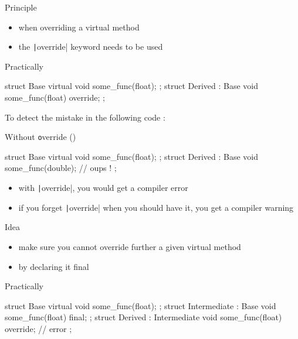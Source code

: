 \begin{frame}[fragile]
  \begin{block}{Principle}
    \begin{itemize}
    \item when overriding a virtual method
    \item the \texttt|override| keyword needs to be used
    \end{itemize}
  \end{block}
  \begin{exampleblock}{Practically}
    \begin{cppcode}
      struct Base {
        virtual void some_func(float);
      };
      struct Derived : Base {
        void some_func(float) override;
      };
    \end{cppcode}
  \end{exampleblock}
\end{frame}

\begin{frame}[fragile]
  To detect the mistake in the following code :
  \begin{block}{Without {\texttt override} ()}
    \begin{cppcode}
      struct Base {
        virtual void some_func(float);
      };
      struct Derived : Base {
        void some_func(double); // oups !
      };
    \end{cppcode}
  \end{block}
  \begin{itemize}
  \item with \texttt|override|, you would get a compiler error
  \item if you forget \texttt|override| when you should have it, you get a compiler warning
  \end{itemize}
\end{frame}

\begin{frame}[fragile]
  \begin{block}{Idea}
    \begin{itemize}
    \item make sure you cannot override further a given virtual method
    \item by declaring it final
    \end{itemize}
  \end{block}
  \begin{exampleblock}{Practically}
    \begin{cppcode}
      struct Base {
        virtual void some_func(float);
      };
      struct Intermediate : Base {
        void some_func(float) final;
      };
      struct Derived : Intermediate {
        void some_func(float) override; // error
      };
    \end{cppcode}
  \end{exampleblock}
\end{frame}

